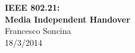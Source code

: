 \begin{center}
\thispagestyle{empty}
\vspace{5em}
\LARGE{\textbf{IEEE 802.21:\\ Media Independent Handover}}\\
\vspace{1em}
\Large{Francesco Soncina}\\
\vspace{1em}
\Large {18/3/2014}\\
\end{center}
